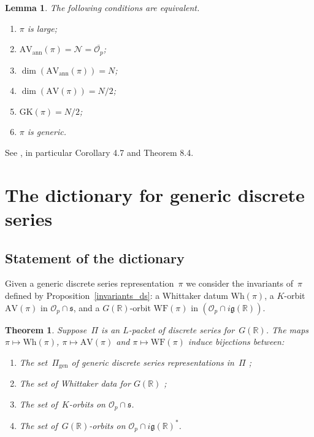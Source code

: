 \documentclass[10pt,leqno]{article}
\newtheorem{theorem}[equation]{Theorem}
\newtheorem{lemma}[equation]{Lemma}
\renewcommand{\O}{\mathcal O}
\newcommand{\R}{\mathbb R}
\newcommand{\N}{\mathcal N}
\newcommand{\g}{\mathfrak g}
\newcommand{\s}{\mathfrak s}
\newcommand{\AV}{\mathrm{AV}}
\newcommand{\Wh}{\mathrm{Wh}}
\newcommand{\WF}{\mathrm{WF}}
\newcommand{\AVann}{\mathrm{AV}_{\mathrm{ann}}}
\newcommand{\GK}{\mathrm{GK}}
\newcommand{\Op}{\O_p}
\begin{document}
\begin{lemma}
  \label{l:large}
  The following conditions are equivalent.
  \begin{enumerate}
    \item $\pi$ is large;
\item $\AVann(\pi)=\N=\overline{\Op}$;
\item $\dim(\AVann(\pi))=N$;
  \item $\dim(\AV(\pi))=N/2$;
  \item $\GK(\pi)=N/2$;
    \item $\pi$ is generic.

\end{enumerate}
\end{lemma}
See \cite{vogan_bowdoin}, in particular Corollary 4.7 and Theorem 8.4.




\section{The dictionary for generic discrete series}


\subsection{Statement of the dictionary}  



Given a generic discrete series representation~$\pi$ we consider the invariants of~$\pi$ defined by Proposition~\ref{invariants_ds}: a Whittaker datum  $\Wh(\pi)$, a $K$-orbit $\AV(\pi)$ in $\mathcal{O}_p \cap \mathfrak{s}$, and a $G(\R)$-orbit $\WF(\pi)$ in $(\mathcal{O}_p \cap  i \g(\R))$.


\begin{theorem} \label{th:main} Suppose~$\Pi$ is an $L$-packet of discrete series for~$G(\R)$. 
The maps $\pi \mapsto \Wh(\pi)$, $\pi \mapsto \AV(\pi)$ and $\pi\mapsto \WF(\pi)$ induce bijections between:
\begin{enumerate}
\item[(1)] The set~$\Pi_{\mathrm{gen}}$ of generic discrete series representations in~$\Pi$ ;
\item[(2)] The set of Whittaker data for $G(\R)$ ;
\item[(3)] The set of~$K$-orbits on $\mathcal{O}_p \cap \s$.
\item[(4)] The set of~$G(\R)$-orbits on $\mathcal{O}_p \cap  i \g(\R)^*$.
\end{enumerate}
\end{theorem}
\end{document}
